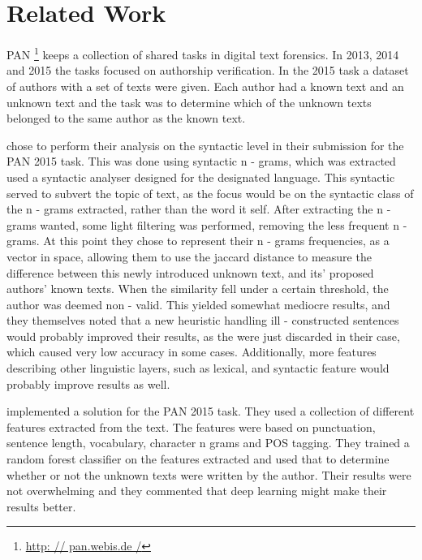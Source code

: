 \section{Related Work}


PAN \footnote{\url{http: // pan.webis.de /}} keeps a collection of shared tasks 
in
digital text forensics. In 2013, 2014 and 2015 the tasks focused on authorship
verification. In the 2015 task a dataset of authors with a set of texts were
given. Each author had a known text and an unknown text and the task was to
determine which of the unknown texts belonged to the same author as the known
text.


\cite{juanpablo2015} chose to perform their analysis on the syntactic level in
their submission for the PAN 2015 task. This was done using syntactic n - grams,
which was extracted used a syntactic analyser designed for the designated
language. This syntactic served to subvert the topic of text, as the focus
would be on the syntactic class of the n - grams extracted, rather than the word
it self.
After extracting the n - grams wanted, some light filtering was performed,
removing the less frequent n - grams. At this point they chose to represent 
their
n - grams frequencies, as a vector in space, allowing them to use the jaccard
distance to measure the difference between this newly introduced unknown text,
and its' proposed authors' known texts. When the similarity fell under a
certain threshold, the author was deemed non - valid.
This yielded somewhat mediocre results, and they themselves noted that a new
heuristic handling ill - constructed sentences would probably improved their
results, as the were just discarded in their case, which caused very low
accuracy in some cases. Additionally, more features describing other linguistic
layers, such as lexical, and syntactic feature would probably improve results
as well.

\cite{maitra2015} implemented a solution for the PAN 2015 task. They used a
collection of different features extracted from the text. The features were
based on punctuation, sentence length, vocabulary, character n grams and
\gls{POS} tagging. They trained a random forest classifier on the features
extracted and used that to determine whether or not the unknown texts were
written by the author. Their results were not overwhelming and they commented
that deep learning might make their results better.

